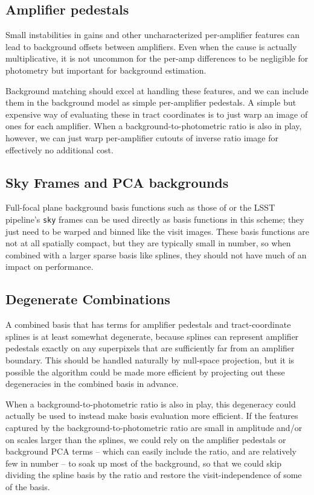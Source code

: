 \documentclass[DM,lsstdraft,authoryear,toc]{lsstdoc}
\begin{document}
\subsection{Amplifier pedestals}

Small instabilities in gains and other uncharacterized per-amplifier features can lead to background offsets between amplifiers.
Even when the cause is actually multiplicative, it is not uncommon for the per-amp differences to be negligible for photometry but important for background estimation.

Background matching should excel at handling these features, and we can include them in the background model as simple per-amplifier pedestals.
A simple but expensive way of evaluating these in tract coordinates is to just warp an image of ones for each amplifier.
When a background-to-photometric ratio is also in play, however, we can just warp per-amplifier cutouts of inverse ratio image for effectively no additional cost.

\subsection{Sky Frames and PCA backgrounds}

Full-focal plane background basis functions such as those of \citet{2017PASP..129k4502B} or the LSST pipeline's \texttt{sky} frames can be used directly as basis functions in this scheme; they just need to be warped and binned like the visit images.
These basis functions are not at all spatially compact, but they are typically small in number, so when combined with a larger sparse basis like splines, they should not have much of an impact on performance.

\subsection{Degenerate Combinations}

A combined basis that has terms for amplifier pedestals and tract-coordinate splines is at least somewhat degenerate, because splines can represent amplifier pedestals exactly on any superpixels that are sufficiently far from an amplifier boundary.
This should be handled naturally by null-space projection, but it is possible the algorithm could be made more efficient by projecting out these degeneracies in the combined basis in advance.

When a background-to-photometric ratio is also in play, this degeneracy could actually be used to instead make basis evaluation more efficient.
If the features captured by the background-to-photometric ratio are small in amplitude and/or on scales larger than the splines, we could rely on the amplifier pedestals or background PCA terms -- which can easily include the ratio, and are relatively few in number -- to soak up most of the background, so that we could skip dividing the spline basis by the ratio and restore the visit-independence of some of the basis.
\end{document}
